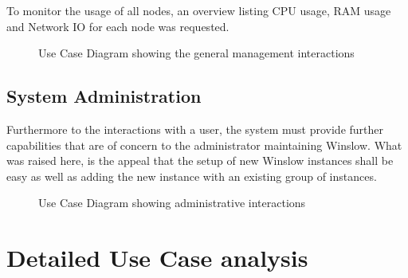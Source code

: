 To monitor the usage of all nodes, an overview listing CPU usage, RAM usage and Network IO for each node was requested.

\begin{figure}[H]
	\centering
	\caption{Use Case Diagram showing the general management interactions}
	\label{use_case:monitor}
\end{figure}


\pagebreak
\subsection{System Administration}

Furthermore to the interactions with a user, the system must provide further capabilities that are of concern to the administrator maintaining Winslow.
What was raised here, is the appeal that the setup of new Winslow instances shall be easy as well as adding the new instance with an existing group of instances.


\begin{figure}[H]
	\centering
	\caption{Use Case Diagram showing administrative interactions}
	\label{use_case:admin}
\end{figure}

\section{Detailed Use Case analysis}

